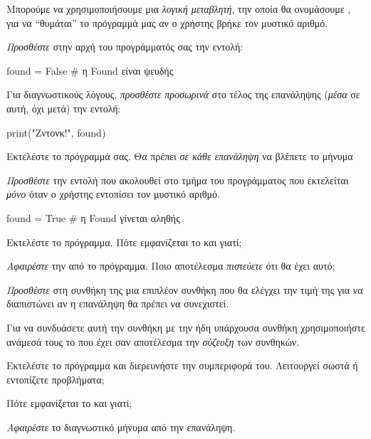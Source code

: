 \documentclass[a4paper,11pt,oneside]{book}
\begin{document}
\begin{step}
Μπορούμε να χρησιμοποιήσουμε μια \emph{λογική μεταβλητή}, την οποία θα ονομάσουμε , για να ``θυμάται'' το πρόγραμμά μας αν ο χρήστης βρήκε τον μυστικό αριθμό.

\emph{Προσθέστε} στην αρχή του προγράμματός σας την εντολή:

\begin{pynew}
found = False    # η Found είναι ψευδής
\end{pynew}

Για διαγνωστικούς λόγους, \emph{προσθέστε προσωρινά} στο τέλος της επανάληψης (\emph{μέσα} σε αυτή, όχι μετά) την εντολή:

\begin{pynew}
print("Ζντονκ!", found)
\end{pynew}

Εκτελέστε το πρόγραμμά σας. Θα πρέπει \emph{σε κάθε επανάληψη} να βλέπετε το μήνυμα 
\end{step}

\begin{step}
\emph{Προσθέστε} την εντολή που ακολουθεί στο τμήμα του προγράμματος που εκτελείται \emph{μόνο} όταν ο χρήστης εντοπίσει τον μυστικό αριθμό.

\begin{pynew}
found = True    # η Found γίνεται αληθής
\end{pynew}

Εκτελέστε το πρόγραμμα. Πότε εμφανίζεται το  και γιατί;

\marginnote[14pt]{\icondiscuss}
\dottedline

\end{step}

\begin{step}
\emph{Αφαιρέστε} την  από το πρόγραμμα. Ποιο αποτέλεσμα \emph{πιστεύετε} ότι θα έχει αυτό;
 
\marginnote[14pt]{\icondiscuss}
\dottedline

\dottedline

\emph{Προσθέστε} στη συνθήκη της  μια επιπλέον συνθήκη που θα ελέγχει την τιμή της  για να διαπιστώνει αν η επανάληψη θα πρέπει να συνεχιστεί.

Για να συνδυάσετε αυτή την συνθήκη με την ήδη υπάρχουσα συνθήκη  χρησιμοποιήστε ανάμεσά τους το  που έχει σαν αποτέλεσμα την \emph{σύζευξη} των συνθηκών.

Εκτελέστε το πρόγραμμα και διερευνήστε την συμπεριφορά του. Λειτουργεί σωστά ή εντοπίζετε προβλήματα;

\marginnote[14pt]{\icondiscuss}
\dottedline

Πότε εμφανίζεται το  και γιατί;

\marginnote[14pt]{\icondiscuss}
\dottedline

\emph{Αφαιρέστε} το διαγνωστικό μήνυμα από την επανάληψη.
\end{step}
\end{document}
